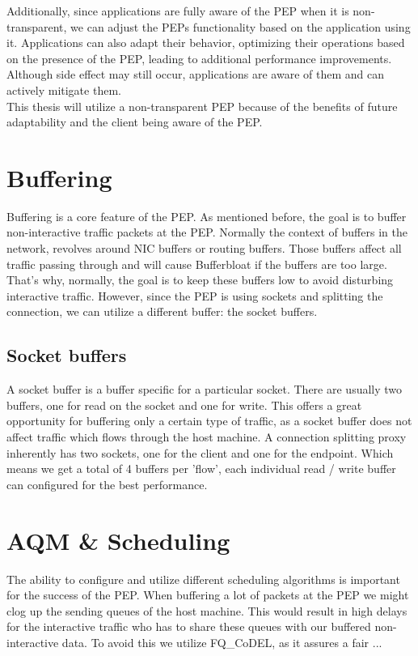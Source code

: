 \documentclass[a4paper,english, 11pt]{report}
\begin{document}
Additionally, since applications are fully aware of the PEP when it is non-transparent, we can adjust the PEPs functionality based on the application using it. Applications can also adapt their behavior, optimizing their operations based on the presence of the PEP, leading to additional performance improvements. Although side effect may still occur, applications are aware of them and can actively mitigate them.\\

This thesis will utilize a non-transparent PEP because of the benefits of future adaptability and the client being aware of the PEP. 

\section{Buffering}
Buffering is a core feature of the PEP. As mentioned before, the goal is to buffer non-interactive traffic packets at the PEP. Normally the context of buffers in the network, revolves around NIC buffers or routing buffers. Those buffers affect all traffic passing through and will cause Bufferbloat if the buffers are too large. That's why, normally, the goal is to keep these buffers low to avoid disturbing interactive traffic. However, since the PEP is using sockets and splitting the connection, we can utilize a different buffer: the socket buffers.

\subsection{Socket buffers}
A socket buffer is a buffer specific for a particular socket. There are usually two buffers, one for read on the socket and one for write. This offers a great opportunity for buffering only a certain type of traffic, as a socket buffer does not affect traffic which flows through the host machine. A connection splitting proxy inherently has two sockets, one for the client and one for the endpoint. Which means we get a total of 4 buffers per 'flow', each individual read / write buffer can configured for the best performance.

\section{AQM \& Scheduling}
The ability to configure and utilize different scheduling algorithms is important for the success of the  PEP. When buffering a lot of packets at the PEP we might clog up the sending queues of the host machine. This would result in high delays for the interactive traffic who has to share these queues with our buffered non-interactive data. To avoid this we utilize FQ\_CoDEL, as it assures a fair ...\\
\end{document}
